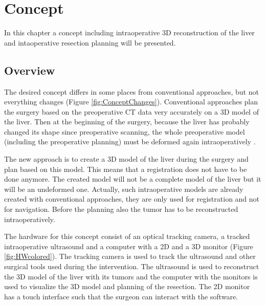 \chapter{Concept}
In this chapter a concept including intraoperative 3D reconstruction of the liver and
intaoperative resection planning will be presented. 

\section{Overview}
The desired concept differs in some places from conventional approaches, but not
everything changes (Figure \ref{fig:ConceptChanges}). Conventional approaches
plan the surgery based on the preoperative CT data very accurately on a 
3D model of the liver. Then at the
beginning of
the surgery, because the liver has probably changed its shape since preoperative
scanning, the whole preoperative model (including the preoperative planning) must be deformed again 
intraoperatively \cite{payan2012soft}.

The new approach is to create a 3D model of the liver during
the surgery and plan based on this model. This means that a registration does
not have to be done anymore. The created model will not be a complete
model of the liver but it will be an undeformed one. Actually, such
intraoperative models are already created with conventional approaches, they are only used for registration
and not for navigation. Before the planning also the tumor has to be
reconstructed intraoperatively.

The hardware for this concept consist of an optical tracking camera, a tracked
intraoperative ultrasound and a computer with a 2D and a 3D monitor (Figure \ref{fig:HWcolored}). The
tracking camera is used to track the ultrasound and other surgical tools used
during the intervention. The ultrasound is used to reconstruct the 3D model of
the liver with its tumors and the computer with the monitors is used to
visualize the 3D model and planning of the resection. The 2D monitor has a touch
interface such that the surgeon can interact with the software.

